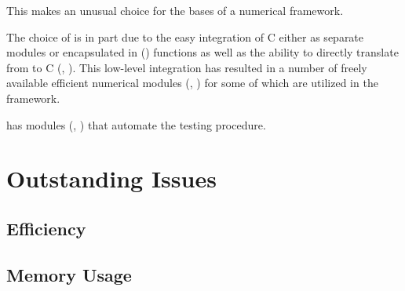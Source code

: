 This makes \Python{} an unusual
choice for the bases of a numerical framework.

The choice of \Python{} is in part due to the easy integration of C
either as separate modules or encapsulated in \Python{} (\weave{})
functions as well as the ability to directly translate from \Python{}
to C (\blitz{}, \PyRex{}).  This low-level integration has resulted in
a number of freely available efficient numerical modules (\SciPy{},
\Numeric{}) for \Python{} some of which are utilized in the \FiPy{}
framework.

\Python{} has modules (\doctest{}, \unittest{}) that automate the
testing procedure.


\section{Outstanding Issues}

\subsection{Efficiency}

\subsection{Memory Usage}